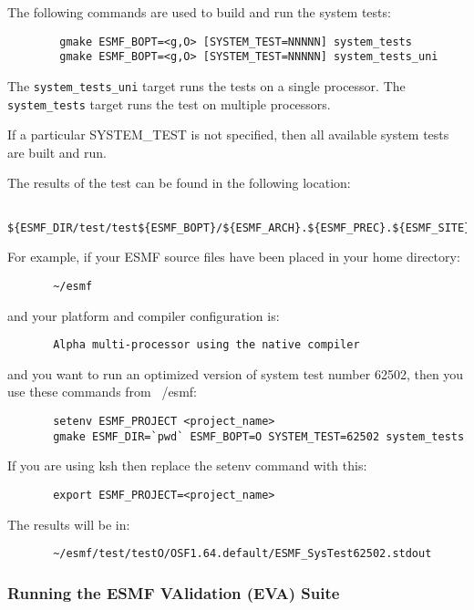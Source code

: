 The following commands are used to build and run the system tests:

\begin{verbatim}
        gmake ESMF_BOPT=<g,O> [SYSTEM_TEST=NNNNN] system_tests
        gmake ESMF_BOPT=<g,O> [SYSTEM_TEST=NNNNN] system_tests_uni
\end{verbatim}

The {\tt system\_tests\_uni} target runs the tests on a single processor. 
The {\tt system\_tests} target runs the test on multiple processors.

If a particular SYSTEM\_TEST is not specified, then all available system tests 
are built and run.

The results of the test can be found in the following location:
\begin{verbatim}
       ${ESMF_DIR/test/test${ESMF_BOPT}/${ESMF_ARCH}.${ESMF_PREC}.${ESMF_SITE}
\end{verbatim}

For example, if your ESMF source files have been placed in your home directory:
\begin{verbatim}
       ~/esmf
\end{verbatim}

and your platform and compiler configuration is:
\begin{verbatim}
       Alpha multi-processor using the native compiler
\end{verbatim}

and you want to run an optimized version of system test number 62502,
then you use these commands from ~/esmf:
\begin{verbatim}
       setenv ESMF_PROJECT <project_name>
       gmake ESMF_DIR=`pwd` ESMF_BOPT=O SYSTEM_TEST=62502 system_tests
\end{verbatim}

If you are using ksh then replace the setenv command with
this:

\begin{verbatim}
       export ESMF_PROJECT=<project_name>
\end{verbatim}

The results will be in:
\begin{verbatim}
       ~/esmf/test/testO/OSF1.64.default/ESMF_SysTest62502.stdout
\end{verbatim}

\subsubsection{Running the ESMF VAlidation (EVA) Suite}
\label{EVATestDescription}

